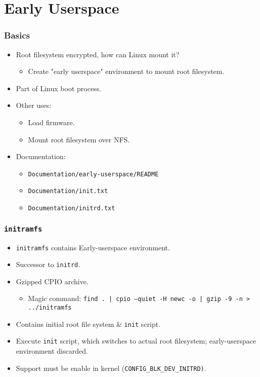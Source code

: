 \documentclass[xcolor={dvipsnames,svgnames},hyperref=dvips]{beamer}
\begin{document}
\section{Early Userspace}\label{section:hell}
	\begin{frame}
		\frametitle{Basics}
		\begin{itemize}
		\item Root filesystem encrypted, how can Linux mount it?
			\begin{itemize}
			\item Create "early userspace" environment to mount root filesystem.
			\end{itemize}
		\item Part of Linux boot process.
		\item Other uses:
			\begin{itemize}
			\item Load firmware.
			\item Mount root filesystem over NFS.
			\end{itemize}
		\item Documentation:
			\begin{itemize}
			\item \texttt{Documentation/early-userspace/README}
			\item \texttt{Documentation/init.txt}
			\item \texttt{Documentation/initrd.txt}
			\end{itemize}
		\end{itemize}
	\end{frame}

	\begin{frame}
		\frametitle{\texttt{initramfs}}
		\begin{itemize}
		\item \texttt{initramfs} contains Early-userspace environment.
		\item Successor to \texttt{initrd}.
		\item Gzipped CPIO archive.
			\begin{itemize}
			\item Magic command: \texttt{find . | cpio --quiet -H newc -o | gzip -9 -n > ../initramfs}
			\end{itemize}
		\item Contains initial root file system \& \texttt{init} script.
		\item Execute \texttt{init} script, which switches to actual root filesystem; early-userspace environment discarded.
		\item Support must be enable in kernel (\texttt{CONFIG\_BLK\_DEV\_INITRD)}.
		\end{itemize}
	\end{frame}
\end{document}

